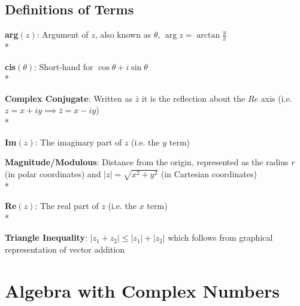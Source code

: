 \documentclass[]{article}
\begin{document}
    \subsection{Definitions of Terms}
        \noindent \textbf{arg$(z)$}: Argument of $z$, also known as $\theta$, $\arg{z}=\arctan{\frac{y}{x}}$ \\*
    
        \noindent \textbf{cis$(\theta)$}: Short-hand for $\cos{\theta}+i\sin{\theta}$ \\*
        
        \noindent \textbf{Complex Conjugate}: Written as $\bar{z}$ it is the reflection about the $Re$ axis (i.e. $z=x+iy \implies \bar{z}=x-iy$) \\*
        
        \noindent \textbf{Im$(z)$}: The imaginary part of $z$ (i.e. the $y$ term)
        
        \noindent \textbf{Magnitude/Modulous}: Distance from the origin, represented as the radius $r$ (in polar coordinates) and $\left|z\right|=\sqrt{x^2+y^2}$ (in Cartesian coordinates) \\*
        
        \noindent \textbf{Re$(z)$}: The real part of $z$ (i.e. the $x$ term) \\*  
        
        \noindent \textbf{Triangle Inequality}: $\left|z_1+z_2\right|\le\left|z_1\right|+\left|z_2\right|$ which follows from graphical representation of vector addition
        
        
\section{Algebra with Complex Numbers}
\end{document}
